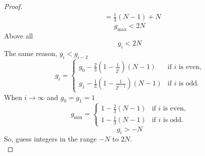\begin{proof}
\begin{align*}
    &=\frac{1}{3}(N-1)+N
    \end{align*}
    \[g_{\max}<2N\]
    Above all
    \[g_i<2N\]
    The same reason, $g_i<g_{i-2}$
    \[g_i=
    \begin{cases}
        g_0-\frac{2}{3}(1-\frac{1}{2^i})(N-1) & \text{if $i$ is even,}\\
        g_1-\frac{1}{3}(1-\frac{1}{2^{i-1}})(N-1) & \text{if $i$ is odd.}
    \end{cases}\]
    When $i \to \infty$ and $g_0=g_1=1$
    \[g_{\min}=
    \begin{cases}
        1-\frac{2}{3}(N-1) & \text{if $i$ is even,}\\
        1-\frac{1}{3}(N-1) & \text{if $i$ is odd.}
    \end{cases}\]
    \[g_{i}>-N\]
    So, guess integers in the range $-N$ to $2N$.\\
\end{proof}
